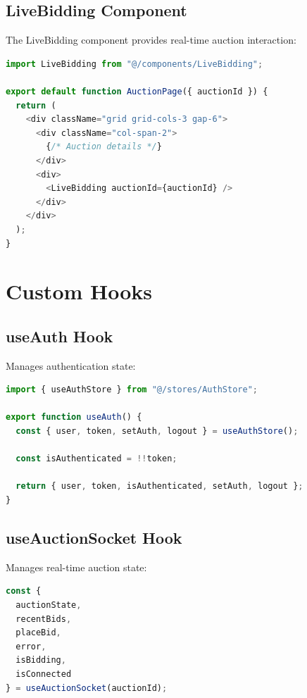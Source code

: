 \documentclass[12pt,a4paper]{report}
\begin{document}
\subsection{LiveBidding Component}

The LiveBidding component provides real-time auction interaction:

\begin{lstlisting}[language=JavaScript, caption=LiveBidding Component Usage]
import LiveBidding from "@/components/LiveBidding";

export default function AuctionPage({ auctionId }) {
  return (
    <div className="grid grid-cols-3 gap-6">
      <div className="col-span-2">
        {/* Auction details */}
      </div>
      <div>
        <LiveBidding auctionId={auctionId} />
      </div>
    </div>
  );
}
\end{lstlisting}

\section{Custom Hooks}

\subsection{useAuth Hook}

Manages authentication state:

\begin{lstlisting}[language=JavaScript, caption=useAuth Hook]
import { useAuthStore } from "@/stores/AuthStore";

export function useAuth() {
  const { user, token, setAuth, logout } = useAuthStore();
  
  const isAuthenticated = !!token;
  
  return { user, token, isAuthenticated, setAuth, logout };
}
\end{lstlisting}

\subsection{useAuctionSocket Hook}

Manages real-time auction state:

\begin{lstlisting}[language=JavaScript, caption=useAuctionSocket Hook]
const { 
  auctionState, 
  recentBids, 
  placeBid, 
  error, 
  isBidding,
  isConnected 
} = useAuctionSocket(auctionId);
\end{lstlisting}
\end{document}
